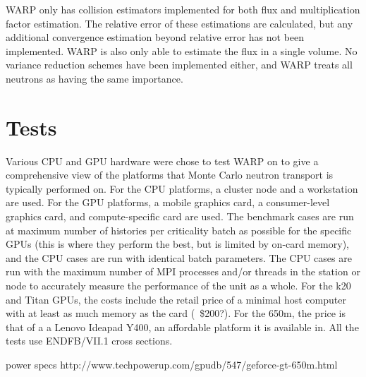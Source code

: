 \documentclass[preprint,12pt]{elsarticle}
\begin{document}
WARP only has collision estimators implemented for both flux and multiplication factor estimation.  The relative error of these estimations are calculated, but any additional convergence estimation beyond relative error has not been implemented.  WARP is also only able to estimate the flux in a single volume.  No variance reduction schemes have been implemented either, and WARP treats all neutrons as having the same importance.

\section{Tests}
\label{sec:tests}

Various CPU and GPU hardware were chose to test WARP on to give a comprehensive view of the platforms that Monte Carlo neutron transport is typically performed on.  For the CPU platforms, a cluster node and a workstation are used.  For the GPU platforms, a mobile graphics card, a consumer-level graphics card, and compute-specific card are used. The benchmark cases are run at maximum number of histories per criticality batch as possible for the specific GPUs (this is where they perform the best, but is limited by on-card memory), and the CPU cases are run with identical batch parameters.  The CPU cases are run with the maximum number of MPI processes and/or threads in the station or node to accurately measure the performance of the unit as a whole. For the k20 and Titan GPUs, the costs include the retail price of a minimal host computer with at least as much memory as the card (~\$200?).  For the 650m, the price is that of a a Lenovo Ideapad Y400, an affordable platform it is available in.   All the tests use ENDFB/VII.1 cross sections.

power specs http://www.techpowerup.com/gpudb/547/geforce-gt-650m.html
\end{document}
